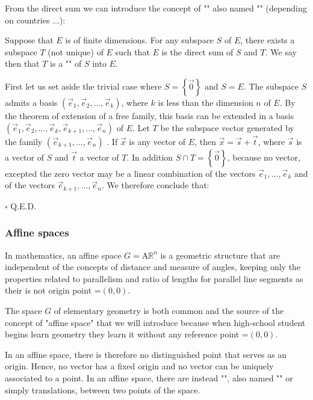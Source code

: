 	From the direct sum we can introduce the concept of "" also named "" (depending on countries ...):
	\begin{theorem}
	Suppose that $E$ is of finite dimensions. For any subspace $S$ of $E$, there exists a subspace $T$ (not unique) of $E$ such that $E$ is the direct sum of $S$ and $T$. We say then that $T$ is a "" of $S$ into $E$.
	\end{theorem}
	\begin{dem}
	First let us set aside the trivial case where $S=\left\lbrace \vec{0} \right\rbrace$  and $S = E$. The subspace $S$ admits a basis $(\vec{e}_1,\vec{e}_2,...,\vec{e}_k)$, where $k$ is less than the dimension $n$ of $E$. By the theorem of extension of a free family, this basis can be extended in a basis $(\vec{e}_1,\vec{e}_2,...,\vec{e}_k,\vec{e}_{k+1},...,\vec{e}_n)$ of $E$. Let $T$ be the subspace vector generated by the family $(\vec{e}_{k+1},...,\vec{e}_n)$ . If $\vec{x}$ is any vector of $E$, then $\vec{x}=\vec{s}+\vec{t}$, where $\vec{s}$ is a vector of $S$ and $\vec{t}$ a vector of $T$. In addition $S\cap T=\left\lbrace \vec{0} \right\rbrace$, because no vector, excepted the zero vector may be a linear combination of the vectors $\vec{e}_1,...,\vec{e}_k$ and of the vectors $\vec{e}_{k+1},...,\vec{e}_n$. We therefore conclude that:
	\begin{flushright}
		$\square$  Q.E.D.
	\end{flushright}
	\end{dem}
	
	\subsubsection{Affine spaces}
	In mathematics, an affine space $G=\text{A}\mathbb{R}^n$ is a geometric structure that are independent of the concepts of distance and measure of angles, keeping only the properties related to parallelism and ratio of lengths for parallel line segments as their is not origin point $\text{=}(0,0)$.
	
	The space $G$ of elementary geometry is both common and the source of the concept of "affine space" that we will introduce because when high-school student begins learn geometry they learn it without any reference point $\text{=}(0,0)$.

	In an affine space, there is therefore no distinguished point that serves as an origin. Hence, no vector has a fixed origin and no vector can be uniquely associated to a point. In an affine space, there are instead "", also named "" or simply translations, between two points of the space.
	
